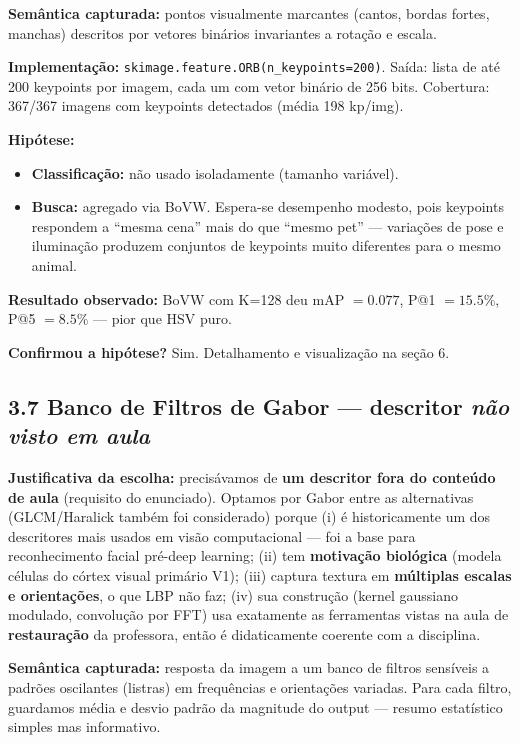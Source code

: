 \documentclass[12pt, a4paper]{article}
\begin{document}
\textbf{Semântica capturada:} pontos visualmente marcantes (cantos, bordas fortes, manchas) descritos por vetores binários invariantes a rotação e escala.

\textbf{Implementação:} \texttt{skimage.feature.ORB(n\_keypoints=200)}. Saída: lista de até 200 keypoints por imagem, cada um com vetor binário de 256 bits. Cobertura: 367/367 imagens com keypoints detectados (média 198 kp/img).

\textbf{Hipótese:}
\begin{itemize}
    \item \textbf{Classificação:} não usado isoladamente (tamanho variável).
    \item \textbf{Busca:} agregado via BoVW. Espera-se desempenho modesto, pois keypoints respondem a ``mesma cena'' mais do que ``mesmo pet'' --- variações de pose e iluminação produzem conjuntos de keypoints muito diferentes para o mesmo animal.
\end{itemize}

\textbf{Resultado observado:} BoVW com K=128 deu mAP $= 0.077$, P@1 $= 15.5\%$, P@5 $= 8.5\%$ --- pior que HSV puro.

\textbf{Confirmou a hipótese?} Sim. Detalhamento e visualização na seção 6.

\subsection*{3.7 Banco de Filtros de Gabor --- descritor \textit{não visto em aula}}

\textbf{Justificativa da escolha:} precisávamos de \textbf{um descritor fora do conteúdo de aula} (requisito do enunciado). Optamos por Gabor entre as alternativas (GLCM/Haralick também foi considerado) porque (i) é historicamente um dos descritores mais usados em visão computacional --- foi a base para reconhecimento facial pré-deep learning; (ii) tem \textbf{motivação biológica} (modela células do córtex visual primário V1); (iii) captura textura em \textbf{múltiplas escalas e orientações}, o que LBP não faz; (iv) sua construção (kernel gaussiano modulado, convolução por FFT) usa exatamente as ferramentas vistas na aula de \textbf{restauração} da professora, então é didaticamente coerente com a disciplina.

\textbf{Semântica capturada:} resposta da imagem a um banco de filtros sensíveis a padrões oscilantes (listras) em frequências e orientações variadas. Para cada filtro, guardamos média e desvio padrão da magnitude do output --- resumo estatístico simples mas informativo.
\end{document}
